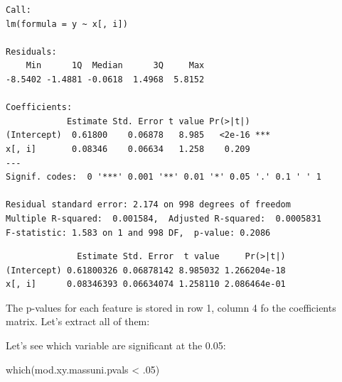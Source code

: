 \documentclass[
]{book}
\newenvironment{Shaded}{\begin{snugshade}}{\end{snugshade}}
\newcommand{\ControlFlowTok}[1]{\textcolor[rgb]{0.13,0.29,0.53}{\textbf{#1}}}
\newcommand{\DecValTok}[1]{\textcolor[rgb]{0.00,0.00,0.81}{#1}}
\newcommand{\FunctionTok}[1]{\textcolor[rgb]{0.00,0.00,0.00}{#1}}
\newcommand{\NormalTok}[1]{#1}
\newcommand{\OtherTok}[1]{\textcolor[rgb]{0.56,0.35,0.01}{#1}}
\newcommand{\SpecialCharTok}[1]{\textcolor[rgb]{0.00,0.00,0.00}{#1}}
\begin{document}
\begin{verbatim}
Call:
lm(formula = y ~ x[, i])

Residuals:
    Min      1Q  Median      3Q     Max 
-8.5402 -1.4881 -0.0618  1.4968  5.8152 

Coefficients:
            Estimate Std. Error t value Pr(>|t|)    
(Intercept)  0.61800    0.06878   8.985   <2e-16 ***
x[, i]       0.08346    0.06634   1.258    0.209    
---
Signif. codes:  0 '***' 0.001 '**' 0.01 '*' 0.05 '.' 0.1 ' ' 1

Residual standard error: 2.174 on 998 degrees of freedom
Multiple R-squared:  0.001584,  Adjusted R-squared:  0.0005831 
F-statistic: 1.583 on 1 and 998 DF,  p-value: 0.2086
\end{verbatim}

\begin{Shaded}
\end{Shaded}

\begin{verbatim}
              Estimate Std. Error  t value     Pr(>|t|)
(Intercept) 0.61800326 0.06878142 8.985032 1.266204e-18
x[, i]      0.08346393 0.06634074 1.258110 2.086464e-01
\end{verbatim}

The p-values for each feature is stored in row 1, column 4 fo the coefficients matrix. Let's extract all of them:

\begin{Shaded}
\end{Shaded}

Let's see which variable are significant at the 0.05:

\begin{Shaded}
\begin{Highlighting}[]
\FunctionTok{which}\NormalTok{(mod.xy.massuni.pvals }\SpecialCharTok{\textless{}}\NormalTok{ .}\DecValTok{05}\NormalTok{)}
\end{Highlighting}
\end{Shaded}
\end{document}
